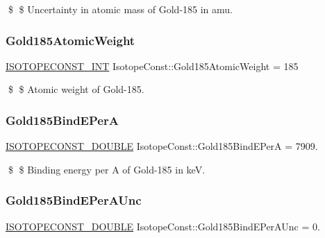 \$ \$ Uncertainty in atomic mass of Gold-\/185 in amu. \mbox{\label{group___isotope_const-_gold-_au185_ga909549896b571630fe66d06e7e7a4604}} 
\subsubsection{\texorpdfstring{Gold185\+Atomic\+Weight}{Gold185AtomicWeight}}
{\footnotesize\ttfamily \mbox{\hyperlink{group___isotope_const-_macros_ga5f18360b3e99483a35c32d789e62621c}{I\+S\+O\+T\+O\+P\+E\+C\+O\+N\+S\+T\+\_\+\+I\+NT}} Isotope\+Const\+::\+Gold185\+Atomic\+Weight = 185}

\$ \$ Atomic weight of Gold-\/185. \mbox{\label{group___isotope_const-_gold-_au185_ga2fbcfff0391af9e968fc81ca17398287}} 
\subsubsection{\texorpdfstring{Gold185\+Bind\+E\+PerA}{Gold185BindEPerA}}
{\footnotesize\ttfamily \mbox{\hyperlink{group___isotope_const-_macros_ga8f45a7272ce02c0b4c65c44636ed719a}{I\+S\+O\+T\+O\+P\+E\+C\+O\+N\+S\+T\+\_\+\+D\+O\+U\+B\+LE}} Isotope\+Const\+::\+Gold185\+Bind\+E\+PerA = 7909.}

\$ \$ Binding energy per A of Gold-\/185 in keV. \mbox{\label{group___isotope_const-_gold-_au185_ga2068c712ee5b8f4eb039fadde050c3ab}} 
\subsubsection{\texorpdfstring{Gold185\+Bind\+E\+Per\+A\+Unc}{Gold185BindEPerAUnc}}
{\footnotesize\ttfamily \mbox{\hyperlink{group___isotope_const-_macros_ga8f45a7272ce02c0b4c65c44636ed719a}{I\+S\+O\+T\+O\+P\+E\+C\+O\+N\+S\+T\+\_\+\+D\+O\+U\+B\+LE}} Isotope\+Const\+::\+Gold185\+Bind\+E\+Per\+A\+Unc = 0.}

